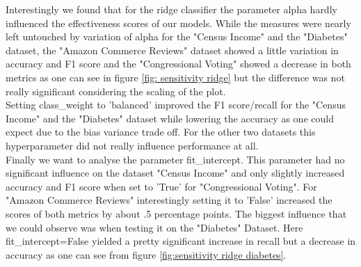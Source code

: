 \documentclass[a4paper,10pt]{article}
\begin{document}
Interestingly we found that for the ridge classifier the parameter \textsf{alpha} hardly influenced the effectiveness scores of our models. While the measures were nearly left untouched by variation of \textsf{alpha} for the "Census Income" and the "Diabetes" dataset, the "Amazon Commerce Reviews" dataset showed a little variation  in accuracy and F1 score and the "Congressional Voting" showed a decrease in both metrics as one can see in figure \ref{fig: sensitivity ridge} but the difference was not really significant considering the scaling of the plot.\\
Setting \textsf{class\_weight} to 'balanced' improved the F1 score/recall for the "Census Income" and the "Diabetes" dataset while lowering the accuracy as one could expect due to the bias variance trade off. For the other two datasets this hyperparameter did not really influence performance at all.\\
Finally we want to analyse the parameter \textsf{fit\_intercept}. This parameter had no significant influence on the dataset "Census Income" and only slightly increased accuracy and F1 score when set to 'True' for "Congressional Voting". For "Amazon Commerce Reviews" interestingly setting it to 'False' increased the scores of both metrics by about .5 percentage points. The biggest influence that we could observe was when testing it on the "Diabetes" Dataset. Here \textsf{fit\_intercept}=False yielded a pretty significant increase in recall but a decrease in accuracy as one can see from figure \ref{fig:sensitivity ridge diabetes}.
\end{document}
